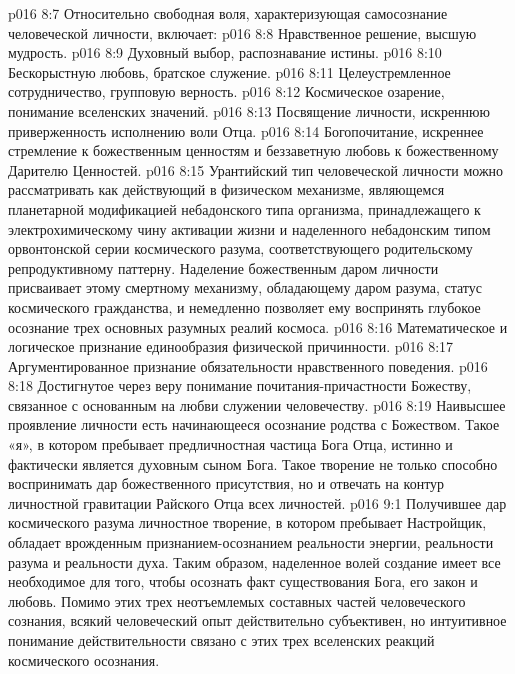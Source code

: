 \vs p016 8:7 \pc Относительно свободная воля, характеризующая самосознание человеческой личности, включает:
\vs p016 8:8 \bibnobreakspace Нравственное решение, высшую мудрость.
\vs p016 8:9 \bibnobreakspace Духовный выбор, распознавание истины.
\vs p016 8:10 \bibnobreakspace Бескорыстную любовь, братское служение.
\vs p016 8:11 \bibnobreakspace Целеустремленное сотрудничество, групповую верность.
\vs p016 8:12 \bibnobreakspace Космическое озарение, понимание вселенских значений.
\vs p016 8:13 \bibnobreakspace Посвящение личности, искреннюю приверженность исполнению воли Отца.
\vs p016 8:14 \bibnobreakspace Богопочитание, искреннее стремление к божественным ценностям и беззаветную любовь к божественному Дарителю Ценностей.
\vs p016 8:15 \pc Урантийский тип человеческой личности можно рассматривать как действующий в физическом механизме, являющемся планетарной модификацией небадонского типа организма, принадлежащего к электрохимическому чину активации жизни и наделенного небадонским типом орвонтонской серии космического разума, соответствующего родительскому репродуктивному паттерну. Наделение божественным даром личности присваивает этому смертному механизму, обладающему даром разума, статус космического гражданства, и немедленно позволяет ему воспринять глубокое осознание трех основных разумных реалий космоса.
\vs p016 8:16 \bibnobreakspace Математическое и логическое признание единообразия физической причинности.
\vs p016 8:17 \bibnobreakspace Аргументированное признание обязательности нравственного поведения.
\vs p016 8:18 \bibnobreakspace Достигнутое через веру понимание почитания\hyp{}причастности Божеству, связанное с основанным на любви служении человечеству.
\vs p016 8:19 \pc Наивысшее проявление личности есть начинающееся осознание родства с Божеством. Такое «я», в котором пребывает предличностная частица Бога Отца, истинно и фактически является духовным сыном Бога. Такое творение не только способно воспринимать дар божественного присутствия, но и отвечать на контур личностной гравитации Райского Отца всех личностей.
\vs p016 9:1 Получившее дар космического разума личностное творение, в котором пребывает Настройщик, обладает врожденным признанием\hyp{}осознанием реальности энергии, реальности разума и реальности духа. Таким образом, наделенное волей создание имеет все необходимое для того, чтобы осознать факт существования Бога, его закон и любовь. Помимо этих трех неотъемлемых составных частей человеческого сознания, всякий человеческий опыт действительно субъективен, но интуитивное понимание действительности связано с  этих трех вселенских реакций космического осознания.
